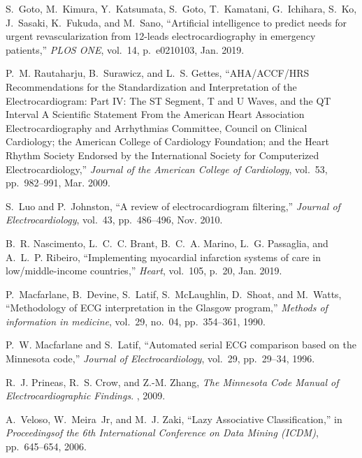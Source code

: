 \documentclass{article}
\begin{document}
\begin{thebibliography}{10}
S.~Goto, M.~Kimura, Y.~Katsumata, S.~Goto, T.~Kamatani, G.~Ichihara, S.~Ko,
  J.~Sasaki, K.~Fukuda, and M.~Sano, ``Artificial intelligence to predict needs
  for urgent revascularization from 12-leads electrocardiography in emergency
  patients,'' {\em PLOS ONE}, vol.~14, p.~e0210103, Jan. 2019.

P.~M. Rautaharju, B.~Surawicz, and L.~S. Gettes, ``{{AHA}}/{{ACCF}}/{{HRS
  Recommendations}} for the {{Standardization}} and {{Interpretation}} of the
  {{Electrocardiogram}}: {{Part IV}}: {{The ST Segment}}, {{T}} and {{U
  Waves}}, and the {{QT Interval A Scientific Statement From}} the {{American
  Heart Association Electrocardiography}} and {{Arrhythmias Committee}},
  {{Council}} on {{Clinical Cardiology}}; the {{American College}} of
  {{Cardiology Foundation}}; and the {{Heart Rhythm Society Endorsed}} by the
  {{International Society}} for {{Computerized Electrocardiology}},'' {\em
  Journal of the American College of Cardiology}, vol.~53, pp.~982--991, Mar.
  2009.

S.~Luo and P.~Johnston, ``A review of electrocardiogram filtering,'' {\em
  Journal of Electrocardiology}, vol.~43, pp.~486--496, Nov. 2010.

B.~R. Nascimento, L.~C.~C. Brant, B.~C.~A. Marino, L.~G. Passaglia, and
  A.~L.~P. Ribeiro, ``Implementing myocardial infarction systems of care in
  low/middle-income countries,'' {\em Heart}, vol.~105, p.~20, Jan. 2019.

P.~Macfarlane, B.~Devine, S.~Latif, S.~McLaughlin, D.~Shoat, and M.~Watts,
  ``Methodology of {{ECG}} interpretation in the {{Glasgow}} program,'' {\em
  Methods of information in medicine}, vol.~29, no.~04, pp.~354--361, 1990.

P.~W. Macfarlane and S.~Latif, ``Automated serial {{ECG}} comparison based on
  the {{Minnesota}} code,'' {\em Journal of Electrocardiology}, vol.~29,
  pp.~29--34, 1996.

R.~J. Prineas, R.~S. Crow, and Z.-M. Zhang, {\em The {{Minnesota}} Code Manual
  of Electrocardiographic Findings}.
, 2009.

A.~Veloso, W.~Meira~Jr, and M.~J. Zaki, ``Lazy {{Associative
  Classification}},'' in {\em Proceedingsof the 6th {{International
  Conference}} on {{Data Mining}} ({{ICDM}})}, pp.~645--654, 2006.


\end{thebibliography}
\end{document}
